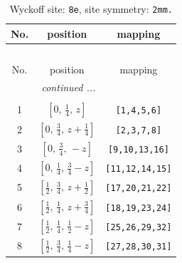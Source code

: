 \documentclass[fleqn,8pt]{jsarticle}
\begin{document}
\begin{longtable}{ccc}
\caption{Wyckoff site: {\tt 8e}, site symmetry: {\tt 2mm.}}
 \\
 \hline \hline
No. & position & mapping \\ \hline \endfirsthead

\multicolumn{2}{l}{\tablename\ \thetable{}} \\
 \hline \hline
No. & position & mapping \\ \hline \endhead

 \hline \hline
\multicolumn{2}{r}{\footnotesize\it continued ...} \\ \endfoot

 \hline \hline
\multicolumn{2}{r}{} \\ \endlastfoot

1 & $\left[ 0,\, \frac{1}{4},\, z \right]$ & {\tt [1,4,5,6]} \\ \hline
2 & $\left[ 0,\, \frac{3}{4},\, z + \frac{1}{4} \right]$ & {\tt [2,3,7,8]} \\ \hline
3 & $\left[ 0,\, \frac{3}{4},\, - z \right]$ & {\tt [9,10,13,16]} \\ \hline
4 & $\left[ 0,\, \frac{1}{4},\, \frac{3}{4} - z \right]$ & {\tt [11,12,14,15]} \\ \hline
5 & $\left[ \frac{1}{2},\, \frac{3}{4},\, z + \frac{1}{2} \right]$ & {\tt [17,20,21,22]} \\ \hline
6 & $\left[ \frac{1}{2},\, \frac{1}{4},\, z + \frac{3}{4} \right]$ & {\tt [18,19,23,24]} \\ \hline
7 & $\left[ \frac{1}{2},\, \frac{1}{4},\, \frac{1}{2} - z \right]$ & {\tt [25,26,29,32]} \\ \hline
8 & $\left[ \frac{1}{2},\, \frac{3}{4},\, \frac{1}{4} - z \right]$ & {\tt [27,28,30,31]} \\
\end{longtable}
\renewcommand{\arraystretch}{1.2}
\end{document}
